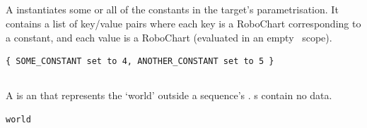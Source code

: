 \subsection{\mtargetinstantiation}

A \mtargetinstantiation{} instantiates some or all of the constants in the
target's parametrisation.  It contains a list of key/value pairs where each key
is a RoboChart \mvariable{} corresponding to a constant, and each value is a
RoboChart \mexpression{} (evaluated in an empty~ scope).

\begin{lstlisting}[style=Example]
{ SOME_CONSTANT set to 4, ANOTHER_CONSTANT set to 5 }
\end{lstlisting}

\subsection{\mworld}\label{ssec:metamodel-actors-world}

A \mworld{} is an \mactor{} that represents the `world' outside a sequence's
\mtarget.  \mworld s contain no data.

\begin{lstlisting}[style=Example]
world
\end{lstlisting}


